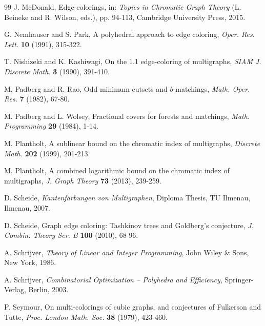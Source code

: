 \documentclass[11pt]{article}
\begin{document}
\begin{thebibliography}{99}
\vspace{-2mm}
 J. McDonald, Edge-colorings, in: {\em Topics in Chromatic Graph Theory} (L. Beineke and 
R. Wilson, eds.), pp. 94-113, Cambridge University Press, 2015.

\vspace{-2mm}
 G. Nemhauser and S. Park, A polyhedral approach to edge coloring,
{\em Oper. Res. Lett.} {\bf 10} (1991), 315-322.

\vspace{-2mm}
 T. Nishizeki and K. Kashiwagi, On the 1.1 edge-coloring of multigraphs,
{\em SIAM J. Discrete Math.} {\bf 3} (1990), 391-410.

\vspace{-2mm}
 M. Padberg and R. Rao, Odd minimum cutsets and $b$-matchings, {\em Math. Oper.
Res.} {\bf 7} (1982), 67-80.

\vspace{-2mm}
 M. Padberg and L. Wolsey, Fractional covers for forests and matchings, {\em
Math. Programming} {\bf 29} (1984), 1-14.


\vspace{-2mm}
 M. Plantholt, A sublinear bound on the chromatic index of multigraphs, {\it Discrete Math.}
{\bf 202} (1999), 201-213.

\vspace{-2mm}
 M. Plantholt, A combined logarithmic bound on the chromatic index of multigraphs,
{\em J. Graph Theory}  {\bf 73} (2013), 239-259. 

\vspace{-2mm}
 D. Scheide, {\em Kantenf\"{a}rbungen von Multigraphen}, Diploma Thesis, TU Ilmenau, 
Ilmenau, 2007.

\vspace{-2mm}
 D. Scheide, Graph edge coloring: Tashkinov trees and Goldberg's conjecture,  
{\em J. Combin. Theory Ser. B} {\bf 100} (2010), 68-96.

\vspace{-2mm} 
 A. Schrijver, {\em Theory of Linear and Integer Programming}, John Wiley
\& Sons, New York, 1986.

\vspace{-2mm}
 A. Schrijver, {\it Combinatorial Optimization -- Polyhedra and Efficiency},
Springer-Verlag, Berlin, 2003.

\vspace{-2mm}
 P. Seymour, On multi-colorings of cubic graphs, and conjectures of Fulkerson
and Tutte, {\em Proc. London Math. Soc.} {\bf 38} (1979), 423-460.


\end{thebibliography}
\end{document}
